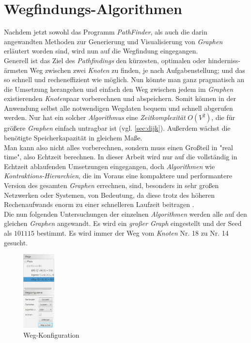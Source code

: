 \documentclass[12pt]{article}
\begin{document}
\section{Wegfindungs-Algorithmen}
Nachdem jetzt sowohl das Programm \textit{PathFinder}, als auch die darin angewandten Methoden zur Generierung und Visualisierung von \textit{Graphen} erläutert worden sind, wird nun auf die Wegfindung eingegangen.
\\
Generell ist das Ziel des \textit{Pathfindings} den kürzesten, optimalen oder hinderniss-ärmsten Weg zwischen zwei \textit{Knoten} zu finden, je nach Aufgabenstellung; und das so schnell und recheneffizient wie möglich. Nun könnte man ganz pragmatisch an die Umsetzung herangehen und einfach den Weg zwischen jedem im \textit{Graphen} existierenden \textit{Knoten}paar vorberechnen und abspeichern. Somit können in der Anwendung selbst alle notwendigen Wegdaten bequem und schnell abgerufen werden. Nur hat ein solcher \textit{Algorithmus} eine \textit{Zeitkomplexität} $O(V^2)$, die für größere \textit{Graphen} einfach untragbar ist (vgl. \autoref{sec:dijk}). Außerdem wächst die benötigte Speicherkapazität in gleichem Maße.
\\
Man kann also nicht alles vorberechnen, sondern muss einen Großteil in "real time", also Echtzeit berechnen. In dieser Arbeit wird nur auf die vollständig in Echtzeit ablaufenden Umsetzungen eingegangen, doch \textit{Algorithmen} wie \textit{Kontraktions-Hierarchien}, die im Voraus eine kompaktere und performantere Version des gesamten \textit{Graphen} errechnen, sind, besonders in sehr großen Netzwerken oder Systemen, von Bedeutung, da diese trotz des höheren Rechenaufwands enorm zu einer schnelleren Laufzeit beitragen \cite{contr-hier}.
\\
Die nun folgenden Untersuchungen der einzelnen \textit{Algorithmen} werden alle auf den gleichen \textit{Graphen} angewandt. Es wird ein \textit{großer Graph} eingestellt und der Seed als $101115$ bestimmt. Es wird immer der Weg vom \textit{Knoten} Nr. 18 zu Nr. 14 gesucht.
\begin{figure}
\vspace{-20pt}
\begin{center}
\includegraphics[width=0.15\textwidth]{res/path_cfg.png}
\end{center}
\vspace{-20pt}
\centering
\caption{Weg-Konfiguration}
\label{fig:path-cfg}
\end{figure}
\end{document}

